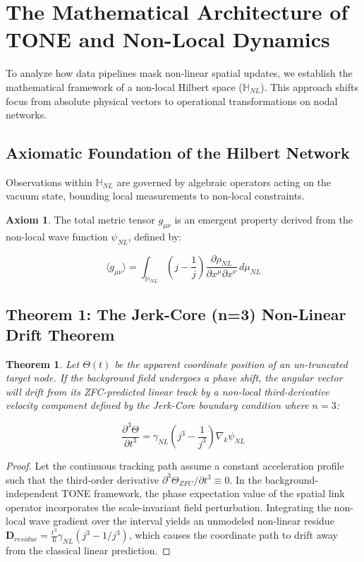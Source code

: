 \documentclass[11pt,a4paper]{article}
\theoremstyle{plain}
\newtheorem{theorem}{Theorem}[section]
\theoremstyle{definition}
\newtheorem{axiom}{Axiom}
\begin{document}
\newpage
\section{The Mathematical Architecture of TONE and Non-Local Dynamics}
To analyze how data pipelines mask non-linear spatial updates, we establish the mathematical framework of a non-local Hilbert space ($\mathbb{H}_{NL}$). This approach shifts focus from absolute physical vectors to operational transformations on nodal networks.

\subsection{Axiomatic Foundation of the Hilbert Network}
Observations within $\mathbb{H}_{NL}$ are governed by algebraic operators acting on the vacuum state, bounding local measurements to non-local constraints.
\begin{axiom}
The total metric tensor $g_{\mu\nu}$ is an emergent property derived from the non-local wave function $\psi_{NL}$, defined by:
\end{axiom}
\begin{equation}
\langle g_{\mu\nu} \rangle = \int_{\mathbb{H}_{NL}} \left(j - \frac{1}{j}\right) \frac{\partial \rho_{NL}}{\partial x^\mu \partial x^\nu} \, d\mu_{NL}
\end{equation}

\subsection{Theorem 1: The Jerk-Core (n=3) Non-Linear Drift Theorem}
\begin{theorem}
Let $\Theta(t)$ be the apparent coordinate position of an un-truncated target node. If the background field undergoes a phase shift, the angular vector will drift from its ZFC-predicted linear track by a non-local third-derivative velocity component defined by the Jerk-Core boundary condition where $n=3$:
\end{theorem}
\begin{equation}
\frac{\partial^3 \Theta}{\partial t^3} = \gamma_{NL} \left( j^3 - \frac{1}{j^3} \right) \nabla_k \psi_{NL}
\end{equation}

\begin{proof}
Let the continuous tracking path assume a constant acceleration profile such that the third-order derivative $\partial^3 \Theta_{ZFC} / \partial t^3 \equiv 0$. In the background-independent TONE framework, the phase expectation value of the spatial link operator incorporates the scale-invariant field perturbation. Integrating the non-local wave gradient over the interval yields an unmodeled non-linear residue $\mathbf{D}_{residue} = \frac{t^3}{6} \gamma_{NL} (j^3 - 1/j^3)$, which causes the coordinate path to drift away from the classical linear prediction.
\end{proof}
\end{document}
